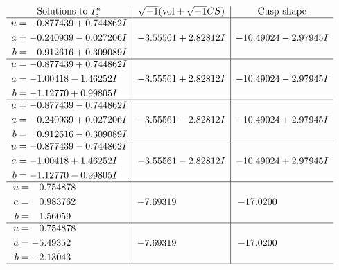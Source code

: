 \documentclass[1p]{elsarticle_modified}
\theoremstyle{definition}
\newcommand{\I}{\sqrt{-1}}
\begin{document}
$$\begin{array}{c|c|c}  
\text{Solutions to }I^u_{3}& \I (\text{vol} + \sqrt{-1}CS) & \text{Cusp shape}\\
 \hline 
\begin{aligned}
u &= -0.877439 + 0.744862 I \\
a &= -0.240939 - 0.027206 I \\
b &= \phantom{-}0.912616 + 0.309089 I\end{aligned}
 & -3.55561 + 2.82812 I & -10.49024 - 2.97945 I \\ \hline\begin{aligned}
u &= -0.877439 + 0.744862 I \\
a &= -1.00418 - 1.46252 I \\
b &= -1.12770 + 0.99805 I\end{aligned}
 & -3.55561 + 2.82812 I & -10.49024 - 2.97945 I \\ \hline\begin{aligned}
u &= -0.877439 - 0.744862 I \\
a &= -0.240939 + 0.027206 I \\
b &= \phantom{-}0.912616 - 0.309089 I\end{aligned}
 & -3.55561 - 2.82812 I & -10.49024 + 2.97945 I \\ \hline\begin{aligned}
u &= -0.877439 - 0.744862 I \\
a &= -1.00418 + 1.46252 I \\
b &= -1.12770 - 0.99805 I\end{aligned}
 & -3.55561 - 2.82812 I & -10.49024 + 2.97945 I \\ \hline\begin{aligned}
u &= \phantom{-}0.754878\phantom{ +0.000000I} \\
a &= \phantom{-}0.983762\phantom{ +0.000000I} \\
b &= \phantom{-}1.56059\phantom{ +0.000000I}\end{aligned}
 & -7.69319\phantom{ +0.000000I} & -17.0200\phantom{ +0.000000I} \\ \hline\begin{aligned}
u &= \phantom{-}0.754878\phantom{ +0.000000I} \\
a &= -5.49352\phantom{ +0.000000I} \\
b &= -2.13043\phantom{ +0.000000I}\end{aligned}
 & -7.69319\phantom{ +0.000000I} & -17.0200\phantom{ +0.000000I}\\
 \hline 
 \end{array}$$\newpage
\end{document}
